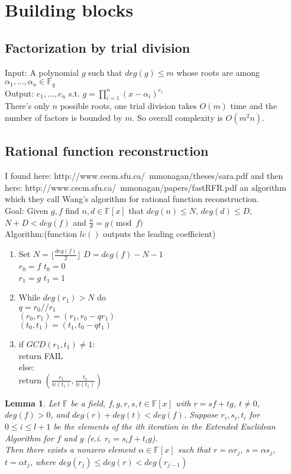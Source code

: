 \documentclass[12pt]{article}
\newcommand{\floor}[1]{\lfloor #1 \rfloor}
\newtheorem{lemma}{Lemma}
\begin{document}
\section{Building blocks}
\subsection{Factorization by trial division}
Input: A polynomial $g$ such that $deg(g) \leq m$ whose roots are among $\alpha_1, \dots , \alpha_n \in \mathbb{F}_q$\\
Output: $e_1, \dots , e_n$ s.t. $g = \prod_{i = 1}^{n}(x - \alpha_i)^{e_i}$\\
There's only $n$ possible roots, one trial division takes $O(m)$ time and the number of factors is bounded by $m$. So overall complexity is $O(m^2n)$.


\subsection{Rational function reconstruction}
I found here: http://www.cecm.sfu.ca/~mmonagan/theses/sara.pdf and then here: http://www.cecm.sfu.ca/~mmonagan/papers/fastRFR.pdf
an algorithm which they call Wang's algorithm for rational function reconstruction.\\
Goal: Given $g,f$ find $n, d \in \mathbb{F}[x]$ that $deg(n) \leq N$, $deg(d) \leq D$, $N + D < deg(f)$ and $\frac{n}{d} = g \pmod{f}$\\
Algorithm:(function $lc()$ outputs the leading coefficient)
\begin{enumerate}
	\item Set $N = \floor{\frac{deg(f)}{2}}$ $D = deg(f) - N - 1$\\
			$r_0 = f$  $t_0 = 0$\\
			$r_1 = g$  $t_1 = 1$\\
	\item While $deg(r_1) > N$ do\\
			$q = r_0 // r_1$\\
			$(r_0, r_1) = (r_1, r_0 - qr_1)$\\
			$(t_0, t_1) = (t_1, t_0 - qt_1)$\\
	\item if $GCD(r_1, t_1) \neq 1$:\\
			return FAIL\\
		  else:\\
			return $(\frac{r_1}{lc(t_1)}, \frac{t_1}{lc(t_1)})$
\end{enumerate}
\begin{lemma}
Let $\mathbb{F}$ be a field, $f, g, r, s, t \in \mathbb{F}[x]$ with $r = sf + tg$, $t \neq 0$, $deg(f) > 0$, and $deg(r) + deg(t) <deg(f)$.
Suppose $r_i, s_i, t_i$ for $0 \leq i \leq l + 1$ be the elements of the ith iteration in the Extended Euclidean Algorithm for $f$ and $g$ (e.i. $r_i = s_if + t_ig$). \\
Then there exists a nonzero element $\alpha \in \mathbb{F}[x]$ such that $r = \alpha r_j$, $s = \alpha s_j$, $t = \alpha t_j$, where $deg(r_j) \leq deg(r) < deg(r_{j-1})$
\end{lemma}
\end{document}
